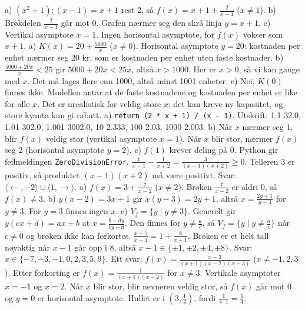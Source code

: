  a) $(x^2 + 1) : (x - 1) = x + 1$ rest $2$, så $f(x) = x + 1 + \frac{2}{x-1}$ ($x \neq 1$).
b) Brøkdelen $\frac{2}{x-1}$ går mot 0. Grafen nærmer seg den skrå linja $y = x + 1$.
c) Vertikal asymptote $x = 1$. Ingen horisontal asymptote, for $f(x)$ vokser som $x + 1$.
 a) $K(x) = 20 + \frac{5000}{x}$ ($x \neq 0$). Horisontal asymptote $y = 20$: kostnaden per enhet nærmer seg 20 kr, som er kostnaden per enhet uten faste kostnader.
b) $\frac{5000 + 20x}{x} < 25$ gir $5000 + 20x < 25x$, altså $x > 1000$. Her er $x > 0$, så vi kan gange med $x$. Det må lages flere enn 1000, altså minst 1001 enheter.
c) Nei, $K(0)$ finnes ikke. Modellen antar at de faste kostnadene og kostnaden per enhet er like for alle $x$. Det er urealistisk for veldig store $x$: det kan kreve ny kapasitet, og store kvanta kan gi rabatt.
 a) \lstinline[style=laereverk,numbers=none,frame=none]|return (2 * x + 1) / (x - 1)|. Utskrift: 1.1 32.0, 1.01 302.0, 1.001 3002.0, 10 2.333, 100 2.03, 1000 2.003.
b) Når $x$ nærmer seg 1, blir $f(x)$ veldig stor (vertikal asymptote $x = 1$). Når $x$ blir stor, nærmer $f(x)$ seg 2 (horisontal asymptote $y = 2$).
c) $f(1)$ krever deling på 0. Python gir feilmeldingen \texttt{ZeroDivisionError}.
 $\frac{1}{x-1} - \frac{1}{x+2} = \frac{3}{(x-1)(x+2)} \ge 0$. Telleren 3 er positiv, så produktet $(x-1)(x+2)$ må være positivt. Svar: $\langle \leftarrow, -2\rangle \cup \langle 1, \rightarrow\rangle$.
 a) $f(x) = 3 + \frac{7}{x-2}$ ($x \neq 2$). Brøken $\frac{7}{x-2}$ er aldri 0, så $f(x) \neq 3$.
b) $y(x-2) = 3x + 1$ gir $x(y-3) = 2y + 1$, altså $x = \frac{2y+1}{y-3}$ for $y \neq 3$. For $y = 3$ finnes ingen $x$.
c) $V_f = \{y \mid y \neq 3\}$. Generelt gir $y(cx+d) = ax+b$ at $x = \frac{b-dy}{cy-a}$. Den finnes for $y \neq \frac{a}{c}$, så $V_f = \{y \mid y \neq \frac{a}{c}\}$ når $c \neq 0$ og brøken ikke kan forkortes.
 $\frac{x+7}{x-1} = 1 + \frac{8}{x-1}$. Brøken er et helt tall nøyaktig når $x - 1$ går opp i 8, altså $x - 1 \in \{\pm1, \pm2, \pm4, \pm8\}$. Svar: $x \in \{-7, -3, -1, 0, 2, 3, 5, 9\}$.
 Ett svar: $f(x) = \frac{x-3}{(x+1)(x-2)(x-3)}$ ($x \neq -1, 2, 3$). Etter forkorting er $f(x) = \frac{1}{(x+1)(x-2)}$ for $x \neq 3$. Vertikale asymptoter $x = -1$ og $x = 2$. Når $x$ blir stor, blir nevneren veldig stor, så $f(x)$ går mot 0 og $y = 0$ er horisontal asymptote. Hullet er i $\left(3, \frac{1}{4}\right)$, fordi $\frac{1}{4 \cdot 1} = \frac{1}{4}$.